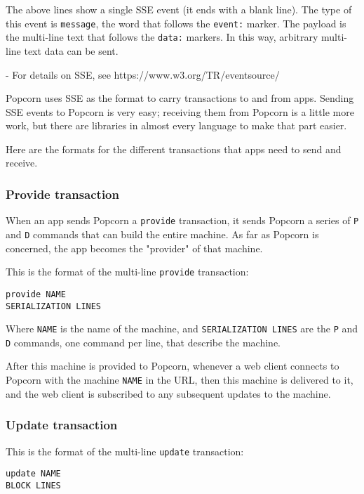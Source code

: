 \documentclass[12pt]{article}
\begin{document}
The above lines show a single SSE event (it ends with a blank
line). The type of this event is \verb`message`, the word that follows the
\verb`event:` marker. The payload is the multi-line text that follows the
\verb`data:` markers. In this way, arbitrary multi-line text data can be
sent.

- For details on SSE, see https://www.w3.org/TR/eventsource/

Popcorn uses SSE as the format to carry transactions to and from apps.
Sending SSE events to Popcorn is very easy; receiving them from
Popcorn is a little more work, but there are libraries in almost every
language to make that part easier.

Here are the formats for the different transactions that apps need to
send and receive.

\subsubsection{Provide transaction}

When an app sends Popcorn a \verb`provide` transaction, it sends Popcorn a
series of \verb`P` and \verb`D` commands that can build the entire machine.  As
far as Popcorn is concerned, the app becomes the "provider" of that
machine.

This is the format of the multi-line \verb`provide` transaction:

\begin{verbatim}
provide NAME
SERIALIZATION LINES
\end{verbatim}

Where \verb`NAME` is the name of the machine, and \verb`SERIALIZATION LINES` are
the \verb`P` and \verb`D` commands, one command per line, that describe the
machine.

After this machine is provided to Popcorn, whenever a web client
connects to Popcorn with the machine \verb`NAME` in the URL, then this
machine is delivered to it, and the web client is subscribed to any
subsequent updates to the machine.

\subsubsection{Update transaction}

This is the format of the multi-line \verb`update` transaction:

\begin{verbatim}
update NAME
BLOCK LINES
\end{verbatim}
\end{document}
